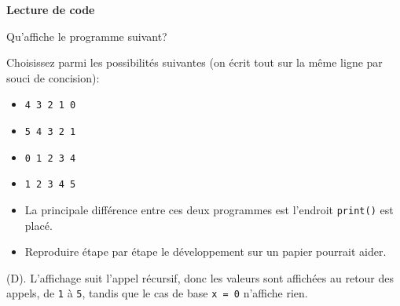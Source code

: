 \begin{Exercice}[5 minutes] [Python] \textbf{Lecture de code}
    
	Qu'affiche le programme suivant?
	
	
	Choisissez parmi les possibilités suivantes (on écrit tout sur la même ligne par souci de concision): \\
	
	\begin{itemize}
            \item[(A)] \texttt{4 3 2 1 0}
            \item[(B)] \texttt{5 4 3 2 1}
            \item[(C)] \texttt{0 1 2 3 4}
            \item[(D)] \texttt{1 2 3 4 5}
        \end{itemize}
	
	 
	
		\begin{conseil} 
		\begin{itemize} 
			\item La principale différence entre ces deux programmes est l'endroit \lstinline{print()} est placé. 
			\item Reproduire étape par étape le développement sur un papier pourrait aider. 
		\end{itemize} 
		\end{conseil} 
	
		\begin{solution}
            (D). L'affichage suit l'appel récursif, donc les valeurs sont affichées au retour des appels, de \texttt{1} à \texttt{5}, tandis que le cas de base \texttt{x = 0} n'affiche rien.
        \end{solution} 
	
\end{Exercice}

